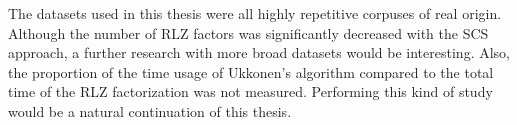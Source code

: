 \documentclass[english,twoside,censored,csm,algorithms-track-2020]{HYthesisML}
\theoremstyle{plain}
\theoremstyle{definition}
\numberwithin{testexample}{chapter}
\begin{document}
The datasets used in this thesis were all highly repetitive
corpuses of real origin. Although the number of RLZ factors was
significantly decreased with the SCS approach, a further research
with more broad datasets would be interesting. Also, the proportion
of the time usage of Ukkonen's algorithm compared to the total time
of the RLZ factorization was not measured. Performing this kind of
study would be a natural continuation of this thesis.


\cleardoublepage                          %
{}  %
\printbibliography

\backmatter

%

\begin{appendices}

%



\end{appendices}
\end{document}

